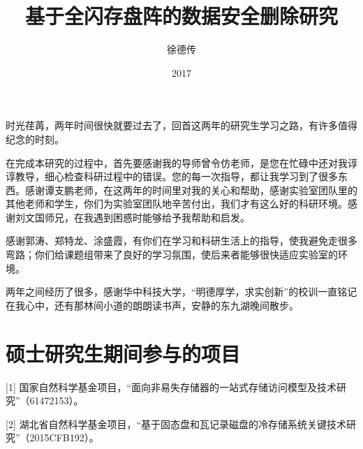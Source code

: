 \documentclass[format=draft,degree=master,language=chinese]{hustthesis} %
\title{基于全闪存盘阵的数据安全删除研究}{Research on Secure Data Deletion of SSD-based Disk Array}
\author{徐德传}{Dechuan Xu}
\date{2017}{5}{23}
\begin{document}
\frontmatter
\maketitle
\makeabstract
\tableofcontents
\listoffigures
\listoftables
\mainmatter






%


\backmatter

\begin{ack}
时光荏苒，两年时间很快就要过去了，回首这两年的研究生学习之路，有许多值得纪念的时刻。


在完成本研究的过程中，首先要感谢我的导师曾令仿老师，是您在忙碌中还对我谆谆教导，细心检查科研过程中的错误。您的每一次指导，都让我学习到了很多东西。感谢谭支鹏老师，在这两年的时间里对我的关心和帮助，感谢实验室团队里的其他老师和学生，你们为实验室团队地辛苦付出，我们才有这么好的科研环境。感谢刘文国师兄，在我遇到困惑时能够给予我帮助和启发。


感谢郭涛、郑特龙、涂盛霞，有你们在学习和科研生活上的指导，使我避免走很多弯路；你们给课题组带来了良好的学习氛围，使后来者能够很快适应实验室的环境。


两年之间经历了很多，感谢华中科技大学，“明德厚学，求实创新”的校训一直铭记在我心中，还有那林间小道的朗朗读书声，安静的东九湖晚间散步。
\end{ack}




\appendix
\renewcommand{\thechapter}{\arabic{chapter}}
\chapter{硕士研究生期间参与的项目}
    [1] 国家自然科学基金项目，“面向非易失存储器的一站式存储访问模型及技术研究”（61472153）。


    [2] 湖北省自然科学基金项目，“基于固态盘和瓦记录磁盘的冷存储系统关键技术研究”（2015CFB192）。
\end{document}
